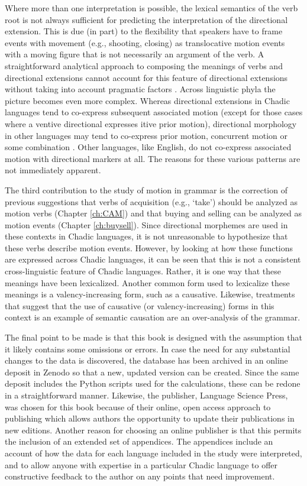 Where more than one interpretation is possible, the lexical semantics of the verb root is not always sufficient for predicting the interpretation of the directional extension. This is due (in part) to the flexibility that speakers have to frame events with movement (e.g., shooting, closing) as translocative motion events with a moving figure that is not necessarily an argument of the verb. A straightforward analytical approach to composing the meanings of verbs and directional extensions cannot account for this feature of directional extensions without taking into account pragmatic factors \citep{nikitinaPragmaticFactorsVariation2008}. Across linguistic phyla the picture becomes even more complex. Whereas directional extensions in Chadic languages tend to co-express subsequent associated motion (except for those cases where a ventive directional expresses itive prior motion), directional morphology in other languages may tend to co-express prior motion, concurrent motion or some combination \citep{dryerAssociatedMotionDirectionals2021}. Other languages, like English, do not co-express associated motion with directional markers at all. The reasons for these various patterns are not immediately apparent.  

The third contribution to the study of motion in grammar is the correction of previous suggestions that verbs of acquisition (e.g., `take') should be analyzed as motion verbs (Chapter \ref{ch:CAM}) and that buying and selling can be analyzed as motion events (Chapter \ref{ch:buysell}). Since directional morphemes are used in these contexts in Chadic languages, it is not unreasonable to hypothesize that these verbs describe motion events. However, by looking at how these functions are expressed across Chadic languages, it can be seen that this is not a consistent cross-linguistic feature of Chadic languages. Rather, it is one way that these meanings have been lexicalized. Another common form used to lexicalize these meanings is a valency-increasing form, such as a causative. Likewise, treatments that suggest that the use of causative (or valency-increasing) forms in this context is an example of semantic causation are an over-analysis of the grammar. 

The final point to be made is that this book is designed with the assumption that it likely contains some omissions or errors. In case the need for any substantial changes to the data is discovered, the database has been archived in an online deposit in Zenodo \citep{lovestrandDirectionalsChadic2023} so that a new, updated version can be created. Since the same deposit includes the Python scripts used for the calculations, these can be redone in a straightforward manner. Likewise, the publisher, Language Science Press, was chosen for this book because of their online, open access approach to publishing which allows authors the opportunity to update their publications in new editions. Another reason for choosing an online publisher is that this permits the inclusion of an extended set of appendices. The appendices include an account of how the data for each language included in the study were interpreted, and to allow anyone with expertise in a particular Chadic language to offer constructive feedback to the author on any points that need improvement. 
